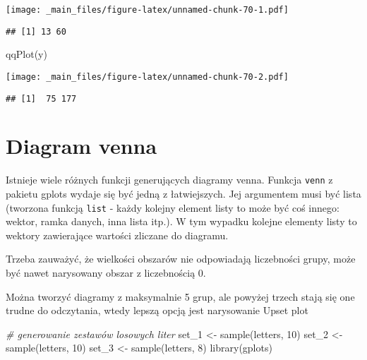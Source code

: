 \documentclass[
]{book}
\newenvironment{Shaded}{\begin{snugshade}}{\end{snugshade}}
\newcommand{\CommentTok}[1]{\textcolor[rgb]{0.56,0.35,0.01}{\textit{#1}}}
\newcommand{\DecValTok}[1]{\textcolor[rgb]{0.00,0.00,0.81}{#1}}
\newcommand{\FunctionTok}[1]{\textcolor[rgb]{0.00,0.00,0.00}{#1}}
\newcommand{\NormalTok}[1]{#1}
\newcommand{\OtherTok}[1]{\textcolor[rgb]{0.56,0.35,0.01}{#1}}
\begin{document}
\texttt{[image: \_main\_files/figure-latex/unnamed-chunk-70-1.pdf]}

\begin{verbatim}
## [1] 13 60
\end{verbatim}

\begin{Shaded}
\begin{Highlighting}[]
\FunctionTok{qqPlot}\NormalTok{(y)}
\end{Highlighting}
\end{Shaded}

\texttt{[image: \_main\_files/figure-latex/unnamed-chunk-70-2.pdf]}

\begin{verbatim}
## [1]  75 177
\end{verbatim}

\hypertarget{diagram-venna}{%
\section{Diagram venna}\label{diagram-venna}}

Istnieje wiele różnych funkcji generujących diagramy venna. Funkcja \texttt{venn} z pakietu gplots wydaje się być jedną z łatwiejszych. Jej argumentem musi być lista (tworzona funkcją \texttt{list} - każdy kolejny element listy to może być coś innego: wektor, ramka danych, inna lista itp.). W tym wypadku kolejne elementy listy to wektory zawierające wartości zliczane do diagramu.

Trzeba zauważyć, że wielkości obszarów nie odpowiadają liczebności grupy, może być nawet narysowany obszar z liczebnością 0.

Można tworzyć diagramy z maksymalnie 5 grup, ale powyżej trzech stają się one trudne do odczytania, wtedy lepszą opcją jest narysowanie Upset plot

\begin{Shaded}
\begin{Highlighting}[]
\CommentTok{\# generowanie zestawów losowych liter}
\NormalTok{set\_1 }\OtherTok{\textless{}{-}} \FunctionTok{sample}\NormalTok{(letters, }\DecValTok{10}\NormalTok{)}
\NormalTok{set\_2 }\OtherTok{\textless{}{-}} \FunctionTok{sample}\NormalTok{(letters, }\DecValTok{10}\NormalTok{)}
\NormalTok{set\_3 }\OtherTok{\textless{}{-}} \FunctionTok{sample}\NormalTok{(letters, }\DecValTok{8}\NormalTok{)}
\FunctionTok{library}\NormalTok{(gplots)}
\end{Highlighting}
\end{Shaded}
\end{document}
